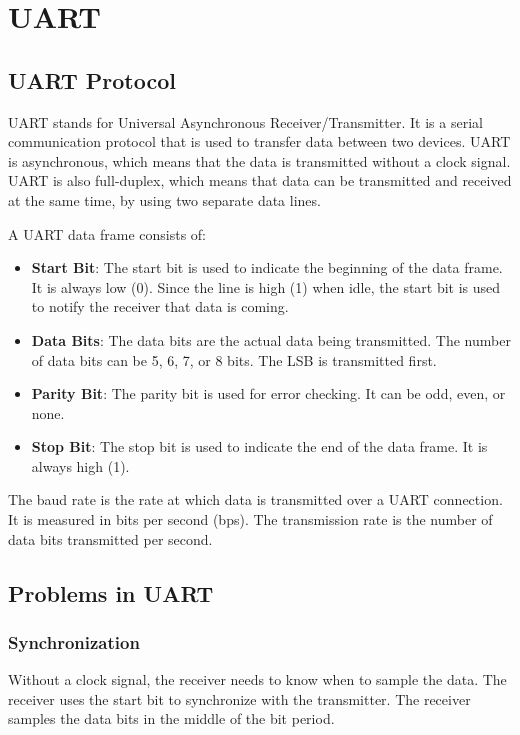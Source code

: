 \documentclass[a4paper,12pt]{article}
\begin{document}
\section{UART}

\subsection{UART Protocol}

UART stands for Universal Asynchronous Receiver/Transmitter. It is a serial communication protocol that is used to transfer data between two devices. UART is asynchronous, which means that the data is transmitted without a clock signal. UART is also full-duplex, which means that data can be transmitted and received at the same time, by using two separate data lines.

A UART data frame consists of:
\begin{itemize}
	\item \textbf{Start Bit}: The start bit is used to indicate the beginning of the data frame. It is always low (0). Since the line is high (1) when idle, the start bit is used to notify the receiver that data is coming.
	\item \textbf{Data Bits}: The data bits are the actual data being transmitted. The number of data bits can be 5, 6, 7, or 8 bits. The LSB is transmitted first.
	\item \textbf{Parity Bit}: The parity bit is used for error checking. It can be odd, even, or none.
	\item \textbf{Stop Bit}: The stop bit is used to indicate the end of the data frame. It is always high (1).
\end{itemize}

The baud rate is the rate at which data is transmitted over a UART connection. It is measured in bits per second (bps). The transmission rate is the number of data bits transmitted per second.

\subsection{Problems in UART}

\subsubsection{Synchronization}

Without a clock signal, the receiver needs to know when to sample the data. The receiver uses the start bit to synchronize with the transmitter. The receiver samples the data bits in the middle of the bit period.
\end{document}
